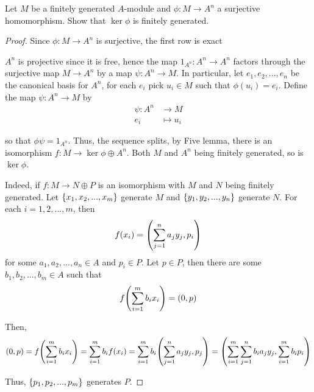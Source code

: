 \begin{problem}
	Let $M$ be a finitely generated $A$-module and $\phi: M \to A^n$ a surjective homomorphism. Show that $\ker \phi$ is finitely generated.
\end{problem}

\begin{proof}
	Since $\phi: M \to A^n$ is surjective, the first row is exact
	\begin{center}
	\end{center}
	
	$A^n$ is projective since it is free, hence the map $1_{A^n}: A^n \to A^n$ factors through the surjective map $M \to A^n$ by a map $\psi: A^n \to M$. In particular, let $e_1, e_2, ..., e_n$ be the canonical basis for $A^n$, for each $e_i$ pick $u_i \in M$ such that $\phi(u_i) = e_i$. Define the map $\psi: A^n \to M$ by
	\begin{align*}
		\psi: A^n &\to M \\
				e_i &\mapsto u_i
	\end{align*}
	
	so that $\phi \psi = 1_{A^n}$. Thus, the sequence splits, by Five lemma, there is an isomorphism $f: M \to \ker \phi \oplus A^n$. Both $M$ and $A^n$ being finitely generated, so is $\ker \phi$.
	
	Indeed, if $f: M \to N \oplus P$ is an isomorphism with $M$ and $N$ being finitely generated. Let $\set{x_1, x_2, ..., x_m}$ generate $M$ and $\set{y_1, y_2, ..., y_n}$ generate $N$. For each $i = 1, 2, ..., m$, then
	$$
		f(x_i) = \tuple*{\sum_{j=1}^n a_j y_j, p_i}
	$$
	for some $a_1, a_2, ..., a_n \in A$ and $p_i \in P$. Let $p \in P$, then there are some $b_1, b_2, ..., b_m \in A$ such that
	$$
		f\tuple*{\sum_{i=1}^m b_i x_i} = (0, p)
	$$
	
	Then,
	$$
		(0, p)
		= f\tuple*{\sum_{i=1}^m b_i x_i} 
		= \sum_{i=1}^m b_i f(x_i) 
		= \sum_{i=1}^m b_i \tuple*{\sum_{j=1}^n a_j y_j, p_j} 
		= \tuple*{\sum_{i=1}^m \sum_{j=1}^n b_i a_j y_j, \sum_{i=1}^m b_i p_i} 
	$$
	
	Thus, $\set{p_1, p_2, ..., p_m}$ generates $P$.
\end{proof}

